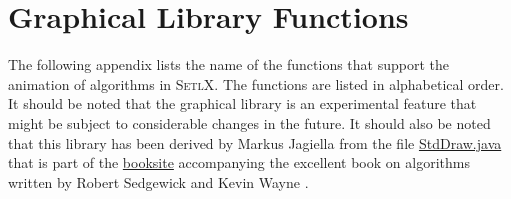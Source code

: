 \appendix
\chapter{Graphical Library Functions}
The following appendix lists the name of the functions that support the
animation of algorithms in \textsc{SetlX}.  The functions are listed in
alphabetical order.  It should be noted that the graphical library is an experimental feature that
might be subject to considerable changes in the future.  It should also be noted that this library
has been derived by Markus Jagiella from the file
\href{http://introcs.cs.princeton.edu/java/stdlib/StdDraw.java.html}{StdDraw.java}
that is part of the 
\href{http://algs4.cs.princeton.edu/home/}{booksite}
accompanying the excellent book on algorithms written by Robert Sedgewick and Kevin Wayne
\cite{sedgewick:11}.   
